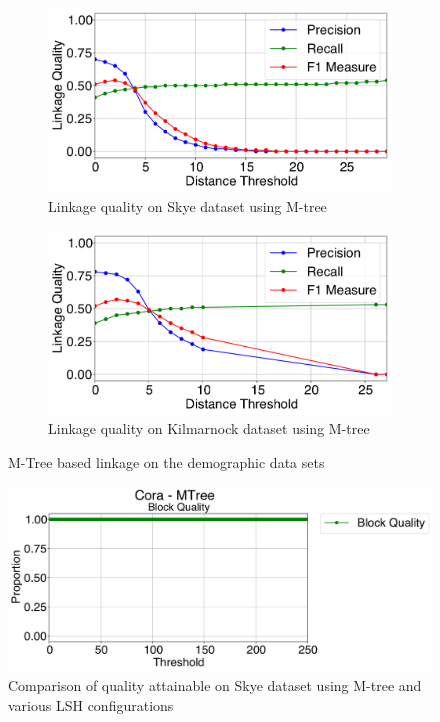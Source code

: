 \documentclass{llncs}
\begin{document}

\begin{figure}
\centering
\begin{subfigure}{.5\textwidth}
  \centering
\includegraphics[width=\textwidth]{figures/skye-mtree}
\caption{Linkage quality on Skye dataset using M-tree\label{skye-quality-mtree}}
\end{subfigure}%
\begin{subfigure}{.5\textwidth}
  \centering
\includegraphics[width=\textwidth]{figures/kili-mtree}
\caption{Linkage quality on Kilmarnock dataset using M-tree\label{kilmarnock-quality-mtree}}
\end{subfigure}
\caption{M-Tree based linkage on the demographic data sets}
\label{demography-quality-mtree}
\end{figure}

\begin{figure}
\includegraphics[width=\textwidth]{figures/plotBQ_--_Cora_-_MTree}
\caption{Comparison of quality attainable on Skye dataset using M-tree and various LSH configurations\label{mtree-lsh-quality}}
\end{figure}
\end{document}
